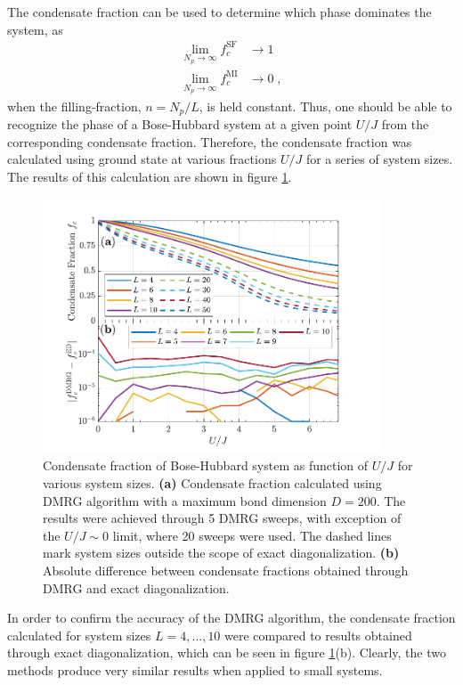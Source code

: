 The condensate fraction can be used to determine which phase dominates the system, as
\begin{align}
	\lim_{N_p \to \infty} f_{c}^{\mathrm{SF}} &\to 1 \label{eq:SF_lim} \\
	\lim_{N_p \to \infty} f_{c}^{\mathrm{MI}} &\to 0 \; , \label{eq:MI_lim}
\end{align}
when the filling-fraction, $n = N_p/L$, is held constant. Thus, one should be able to recognize the phase of a Bose-Hubbard system at a given point $U/J$ from the corresponding condensate fraction.
Therefore, the condensate fraction was calculated using ground state at various fractions $U/J$ for a series of system sizes. The results of this calculation are shown in figure \ref{fig:CondensateFraction}.
\begin{figure}[h!]
    \centering
    \includegraphics[width=0.9\textwidth]{Figures/CondensateFractionCompare.pdf}
 \caption{Condensate fraction of Bose-Hubbard system as function of $U/J$ for various system sizes. \textbf{(a)} Condensate fraction calculated using DMRG algorithm with a maximum bond dimension $D = 200$. The results were achieved through 5 DMRG sweeps, with exception of the $U/J \sim 0$ limit, where 20 sweeps were used. The dashed lines mark system sizes outside the scope of exact diagonalization. \textbf{(b)} Absolute difference between condensate fractions obtained through DMRG and exact diagonalization.}
 \label{fig:CondensateFraction}
\end{figure}

In order to confirm the accuracy of the DMRG algorithm, the condensate fraction calculated for system sizes $L =  4 , \ldots , 10 $ were compared to results obtained through exact diagonalization, which can be seen in figure \ref{fig:CondensateFraction}(b). Clearly, the two methods produce very similar results when applied to small systems.

